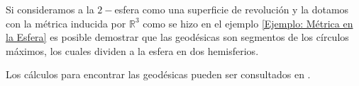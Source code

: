 \begin{example}
  Si consideramos a la $2-$esfera como una superficie de revolución y la dotamos con la métrica inducida por $\mathbb{R}^{3}$ como se hizo en el ejemplo \ref{Ejemplo: Métrica en la Esfera} es posible demostrar que las geodésicas son segmentos de los círculos máximos, los cuales dividen a la esfera en dos hemisferios.

  Los cálculos para encontrar las geodésicas pueden ser consultados en \textcite{delia2011geodesia}.
\end{example}

